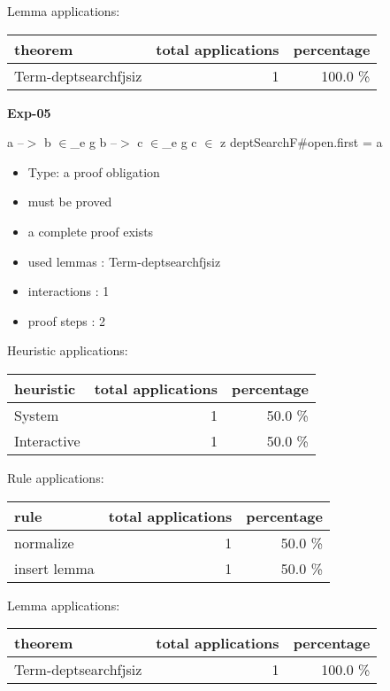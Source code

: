 \documentclass[a4paper]{article}
\begin{document}
Lemma applications:

\begin{supertabular}{l|r|r}
theorem	        & total applications & percentage \\ \hline
Term-deptsearchfjsiz & 1 & 100.0 \% \\

\end{supertabular}
\pagebreak

{\LARGE\bf Exp-05}\label{lemma-Exp-05}

\medskip

 \Fol a --$>$ b $\in$\_e g \And b --$>$ c $\in$\_e g \And c $\in$ z \Imp \Do deptSearchF\#\Dc open.first = a

\begin{itemize}

\item Type: a proof obligation

\item       must be proved
\item       a complete proof exists
\item       used lemmas  : Term-deptsearchfjsiz
\item       interactions : 1
\item       proof steps  : 2
\end{itemize}

\medskip


Heuristic applications:

\begin{supertabular}{l|r|r}
heuristic	& total applications & percentage \\ \hline
System & 1 & 50.0 \% \\
Interactive & 1 & 50.0 \% \\

\end{supertabular}

Rule applications:

\begin{supertabular}{l|r|r}
rule	        & total applications & percentage \\ \hline
normalize & 1 & 50.0 \% \\
insert lemma & 1 & 50.0 \% \\

\end{supertabular}

Lemma applications:

\begin{supertabular}{l|r|r}
theorem	        & total applications & percentage \\ \hline
Term-deptsearchfjsiz & 1 & 100.0 \% \\

\end{supertabular}
\pagebreak
\end{document}
